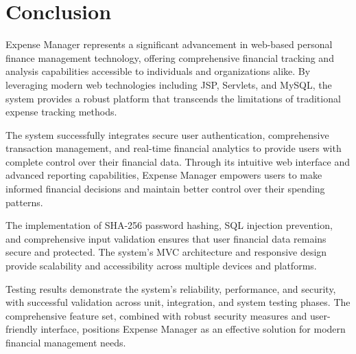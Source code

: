\chapter{Conclusion}

Expense Manager represents a significant advancement in web-based personal finance management technology, offering comprehensive financial tracking and analysis capabilities accessible to individuals and organizations alike. By leveraging modern web technologies including JSP, Servlets, and MySQL, the system provides a robust platform that transcends the limitations of traditional expense tracking methods.

The system successfully integrates secure user authentication, comprehensive transaction management, and real-time financial analytics to provide users with complete control over their financial data. Through its intuitive web interface and advanced reporting capabilities, Expense Manager empowers users to make informed financial decisions and maintain better control over their spending patterns.

The implementation of SHA-256 password hashing, SQL injection prevention, and comprehensive input validation ensures that user financial data remains secure and protected. The system's MVC architecture and responsive design provide scalability and accessibility across multiple devices and platforms.

Testing results demonstrate the system's reliability, performance, and security, with successful validation across unit, integration, and system testing phases. The comprehensive feature set, combined with robust security measures and user-friendly interface, positions Expense Manager as an effective solution for modern financial management needs.